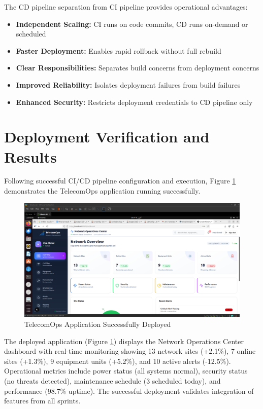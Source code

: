 The CD pipeline separation from CI pipeline provides operational advantages:
\begin{itemize}
\item \textbf{Independent Scaling:} CI runs on code commits, CD runs on-demand or scheduled
\item \textbf{Faster Deployment:} Enables rapid rollback without full rebuild
\item \textbf{Clear Responsibilities:} Separates build concerns from deployment concerns
\item \textbf{Improved Reliability:} Isolates deployment failures from build failures
\item \textbf{Enhanced Security:} Restricts deployment credentials to CD pipeline only
\end{itemize}

\section{Deployment Verification and Results}

Following successful CI/CD pipeline configuration and execution, Figure \ref{fig:app_running} demonstrates the TelecomOps application running successfully.

\begin{figure}[H]
    \centering
    \includegraphics[width=0.95\linewidth]{img/chap_08/apprunning.png}
    \caption{TelecomOps Application Successfully Deployed}
    \label{fig:app_running}
\end{figure}

The deployed application (Figure \ref{fig:app_running}) displays the Network Operations Center dashboard with real-time monitoring showing 13 network sites (+2.1\%), 7 online sites (+1.3\%), 9 equipment units (+5.2\%), and 10 active alerts (-12.5\%). Operational metrics include power status (all systems normal), security status (no threats detected), maintenance schedule (3 scheduled today), and performance (98.7\% uptime). The successful deployment validates integration of features from all sprints.

